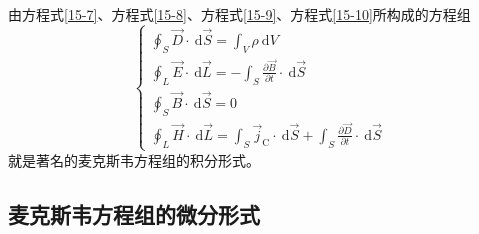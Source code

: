 \documentclass[12pt]{article}
\begin{document}
由方程式\ref{15-7}、方程式\ref{15-8}、方程式\ref{15-9}、方程式\ref{15-10}所构成的方程组
\begin{equation}
\displaystyle
\left\{\begin{array}{l}
\oint_S \overrightarrow{D} \cdot \mathrm{~d} \overrightarrow{S}=\int_V \rho \mathrm{~d} V \\
\oint_L \overrightarrow{E} \cdot \mathrm{~d} \overrightarrow{L}=-\int_S \frac{\partial \overrightarrow{B}}{\partial t} \cdot \mathrm{~d} \overrightarrow{S} \\
\oint_S \overrightarrow{B} \cdot \mathrm{~d} \overrightarrow{S}=0 \\
\oint_L \overrightarrow{H} \cdot \mathrm{~d} \overrightarrow{L}=\int_S \overrightarrow{j}_{\mathrm{C}} \cdot \mathrm{~d} \overrightarrow{S}+\int_S \frac{\partial \overrightarrow{D}}{\partial t} \cdot \mathrm{~d} \overrightarrow{S}
\end{array}\right.
\end{equation}
就是著名的麦克斯韦方程组的积分形式。

\subsection{麦克斯韦方程组的微分形式}
\end{document}
